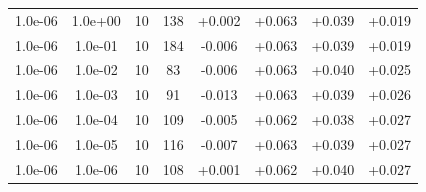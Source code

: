 \documentclass[11pt,a4paper]{article}
\begin{document}
\begin{table}
{\begin{tabular}{*{8}c}
 1.0e-06 	 & 1.0e+00 	 & 10 & 138 	 & +0.002 & +0.063 & +0.039 & +0.019 \\ 
 1.0e-06 	 & 1.0e-01 	 & 10 & 184 	 & -0.006 & +0.063 & +0.039 & +0.019 \\ 
 1.0e-06 	 & 1.0e-02 	 & 10 & 83 	 & -0.006 & +0.063 & +0.040 & +0.025 \\ 
 1.0e-06 	 & 1.0e-03 	 & 10 & 91 	 & -0.013 & +0.063 & +0.039 & +0.026 \\ 
 1.0e-06 	 & 1.0e-04 	 & 10 & 109 	 & -0.005 & +0.062 & +0.038 & +0.027 \\ 
 1.0e-06 	 & 1.0e-05 	 & 10 & 116 	 & -0.007 & +0.063 & +0.039 & +0.027 \\ 
 1.0e-06 	 & 1.0e-06 	 & 10 & 108 	 & +0.001 & +0.062 & +0.040 & +0.027 \\ 
\end{tabular}}
\label{Tab::4}
\end{table} 
\end{document}
